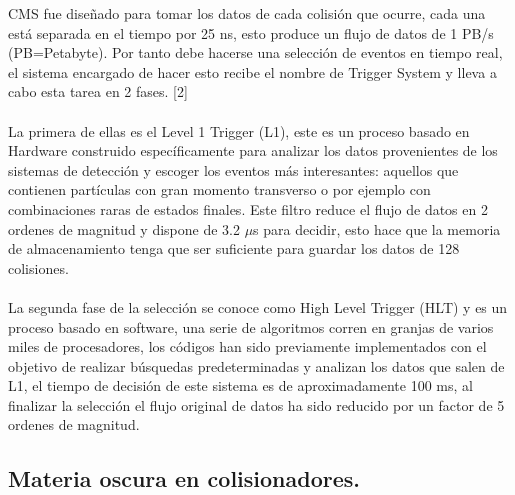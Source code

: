 CMS fue diseñado para tomar los datos de cada colisión que ocurre, cada una está separada en el tiempo por 25 ns, esto produce un flujo de datos de 1 PB/s (PB=Petabyte). Por tanto debe hacerse una selección de eventos en tiempo real, el sistema encargado de hacer esto recibe el nombre de Trigger System y lleva a cabo esta tarea en 2 fases. [2]
\\
\\
La primera de ellas es el Level 1 Trigger (L1), este es un proceso basado en Hardware construido específicamente para analizar los datos provenientes de los sistemas de detección y escoger los eventos más interesantes: aquellos que contienen partículas con gran momento transverso o por ejemplo con combinaciones raras de estados finales. Este filtro reduce el flujo de datos en 2 ordenes de magnitud y dispone de 3.2 $\mu$s para decidir, esto hace que la memoria de almacenamiento tenga que ser suficiente para guardar los datos de 128  colisiones.
\\
\\
La segunda fase de la selección se conoce como High Level Trigger (HLT) y es un proceso basado en software, una serie de algoritmos corren en granjas de varios miles de procesadores, los códigos han sido previamente implementados con el objetivo de realizar búsquedas predeterminadas y analizan los datos que salen de L1, el tiempo de decisión de este sistema es de aproximadamente 100 ms, al finalizar la selección el flujo original de datos ha sido reducido por un factor de 5 ordenes de magnitud.

\subsection{Materia oscura en colisionadores.}

